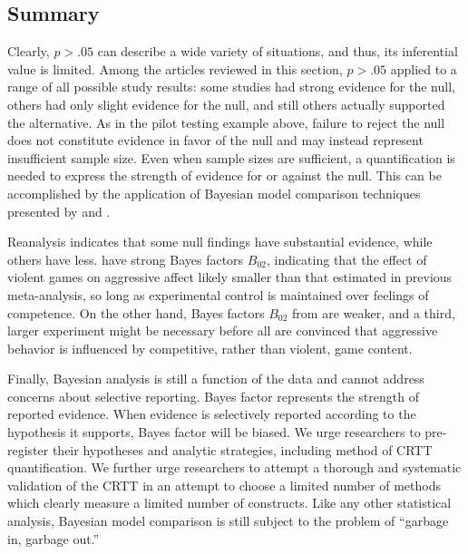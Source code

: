 \documentclass[man]{apa6}
\begin{document}
\subsection{Summary}
Clearly, $p > .05$ can describe a wide variety of situations, and thus, its inferential value is limited. Among the articles reviewed in this section, $p > .05$ applied to a range of all possible study results: some studies had strong evidence for the null, others had only slight evidence for the null, and still others actually supported the alternative. As in the pilot testing example above, failure to reject the null does not constitute evidence in favor of the null and may instead represent insufficient sample size. Even when sample sizes are sufficient, a quantification is needed to express the strength of evidence for or against the null. This can be accomplished by the application of Bayesian model comparison techniques presented by \citet{Rouder:Morey:2012, Rouder:etal:2012}
and \citet{Dienes:2011, Dienes:2014}. %

Reanalysis indicates that some null findings have substantial evidence, while others have less. \citet{Przybylski:etal:2014} have strong Bayes factors $B_{02}$, indicating that the effect of violent games on aggressive affect likely smaller than that estimated in previous meta-analysis, so long as experimental control is maintained over feelings of competence. On the other hand, Bayes factors $B_{02}$ from \citet{Adachi:Willoughby:2011} are weaker, and a third, larger experiment might be necessary before all are convinced that aggressive behavior is influenced by competitive, rather than violent, game content.

Finally, Bayesian analysis is still a function of the data and cannot address concerns about selective reporting. Bayes factor represents the strength of reported evidence. When evidence is selectively reported according to the hypothesis it supports, Bayes factor will be biased. We urge researchers to pre-register their hypotheses and analytic strategies, including method of CRTT quantification. We further urge researchers to attempt a thorough and systematic validation of the CRTT in an attempt to choose a limited number of methods which clearly measure a limited number of constructs. Like any other statistical analysis, Bayesian model comparison is still subject to the problem of ``garbage in, garbage out.''
\end{document}
